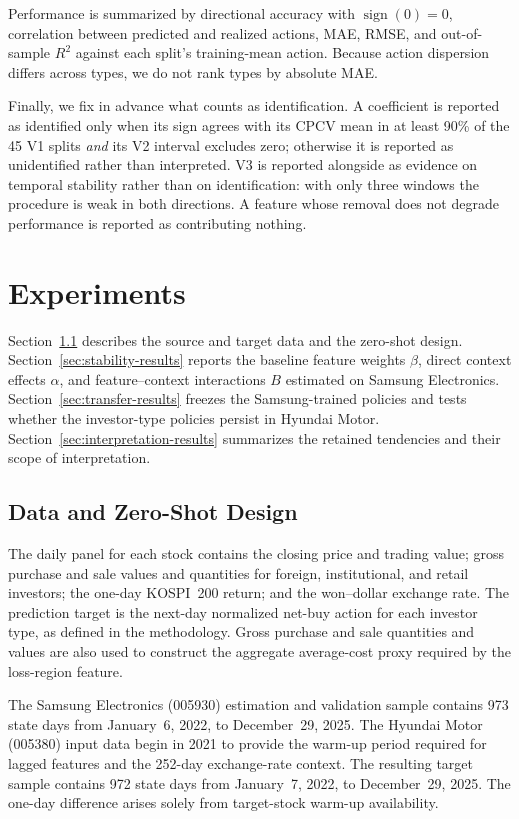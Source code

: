 \documentclass[sigconf,anonymous,review]{acmart}
\begin{document}
Performance is summarized by directional accuracy with
$\operatorname{sign}(0) = 0$, correlation between predicted and realized
actions, MAE, RMSE, and out-of-sample $R^2$ against each split's
training-mean action. Because action dispersion differs across types, we
do not rank types by absolute MAE.

Finally, we fix in advance what counts as identification. A coefficient
is reported as identified only when its sign agrees with its CPCV mean in
at least 90\% of the 45 V1 splits \emph{and} its V2 interval excludes
zero; otherwise it is reported as unidentified rather than interpreted.
V3 is reported alongside as evidence on temporal stability rather than on
identification: with only three windows the procedure is weak in both
directions. A feature whose removal does not degrade performance is
reported as contributing nothing.

\section{Experiments}
\label{sec:experiments}

Section~\ref{sec:data-results} describes the source and target data and the zero-shot design. Section~\ref{sec:stability-results} reports the baseline feature weights $\beta$, direct context effects $\alpha$, and feature--context interactions $B$ estimated on Samsung Electronics. Section~\ref{sec:transfer-results} freezes the Samsung-trained policies and tests whether the investor-type policies persist in Hyundai Motor. Section~\ref{sec:interpretation-results} summarizes the retained tendencies and their scope of interpretation.

\subsection{Data and Zero-Shot Design}
\label{sec:data-results}

The daily panel for each stock contains the closing price and trading value; gross purchase and sale values and quantities for foreign, institutional, and retail investors; the one-day KOSPI~200 return; and the won--dollar exchange rate. The prediction target is the next-day normalized net-buy action for each investor type, as defined in the methodology. Gross purchase and sale quantities and values are also used to construct the aggregate average-cost proxy required by the loss-region feature.

The Samsung Electronics (005930) estimation and validation sample contains 973 state days from January~6, 2022, to December~29, 2025. The Hyundai Motor (005380) input data begin in 2021 to provide the warm-up period required for lagged features and the 252-day exchange-rate context. The resulting target sample contains 972 state days from January~7, 2022, to December~29, 2025. The one-day difference arises solely from target-stock warm-up availability.
\end{document}
